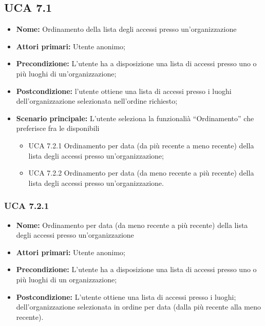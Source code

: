 \subsection{UCA 7.1}%
\begin{itemize}
\item \textbf{Nome:} Ordinamento della lista degli accessi presso un’organizzazione
\item \textbf{Attori primari:} Utente anonimo;
\item \textbf{Precondizione:} L’utente ha a disposizione una lista di accessi presso uno o più luoghi di un'organizzazione;
\item \textbf{Postcondizione:} l’utente ottiene una lista di accessi presso i luoghi dell’organizzazione selezionata nell’ordine richiesto;
\item \textbf{Scenario principale:} L’utente seleziona la funzionalià “Ordinamento” che preferisce fra le disponibili
	\begin{itemize}
	\item UCA 7.2.1 Ordinamento per data (da più recente a meno recente) della lista degli accessi presso un’organizzazione;
	\item UCA 7.2.2 Ordinamento per data (da meno recente a più recente) della lista degli accessi presso un’organizzazione.
	\end{itemize}
\end{itemize}

\subsubsection{UCA 7.2.1}%
\begin{itemize}
\item \textbf{Nome:} Ordinamento per data (da meno recente a più recente) della lista degli accessi presso un’organizzazione
\item \textbf{Attori primari:} Utente anonimo;
\item \textbf{Precondizione:} L’utente ha a disposizione una lista di accessi presso uno o più luoghi di un organizzazione;
\item \textbf{Postcondizione:} L’utente ottiene una lista di accessi presso i luoghi; dell’organizzazione selezionata in ordine per data (dalla più recente alla meno recente).
\end{itemize}

